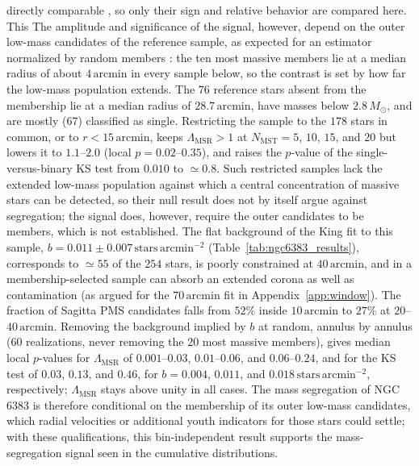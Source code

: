 \documentclass{aa}
\providecommand{\DIFaddtex}[1]{{\protect\color[rgb]{0,0,0.7}#1}} %
\providecommand{\DIFdeltex}[1]{{\protect\color[rgb]{0.65,0,0}\footnotesize #1}} %
\providecommand{\DIFaddbegin}{} %
\providecommand{\DIFaddend}{} %
\providecommand{\DIFdelbegin}{} %
\providecommand{\DIFdelend}{} %
\providecommand{\DIFadd}[1]{\texorpdfstring{\DIFaddtex{#1}}{#1}} %
\providecommand{\DIFdel}[1]{\texorpdfstring{\DIFdeltex{#1}}{}} %
\providecommand{\DIFscaledelfig}{0.5}
\newlength{\DIFdelgraphicswidth} %
\newlength{\DIFdelgraphicsheight} %
\providecommand{\DIFaddincludegraphics}[2][]{{\color{blue}\fbox{\DIFOincludegraphics[#1]{#2}}}} %
\providecommand{\DIFdelincludegraphics}[2][]{%
\sbox{\DIFdelgraphicsbox}{\DIFOincludegraphics[#1]{#2}}%
\settoboxwidth{\DIFdelgraphicswidth}{\DIFdelgraphicsbox} %
\settoboxtotalheight{\DIFdelgraphicsheight}{\DIFdelgraphicsbox} %
\scalebox{\DIFscaledelfig}{%
\parbox[b]{\DIFdelgraphicswidth}{\usebox{\DIFdelgraphicsbox}\\[-\baselineskip] \rule{\DIFdelgraphicswidth}{0em}}\llap{\resizebox{\DIFdelgraphicswidth}{\DIFdelgraphicsheight}{%
\setlength{\unitlength}{\DIFdelgraphicswidth}%
\begin{picture}(1,1)%
\thicklines\linethickness{2pt} %
{\color[rgb]{1,0,0}\put(0,0){\framebox(1,1){}}}%
{\color[rgb]{1,0,0}\put(0,0){\line( 1,1){1}}}%
{\color[rgb]{1,0,0}\put(0,1){\line(1,-1){1}}}%
\end{picture}%
}\hspace*{3pt}}} %
} %
\DeclareRobustCommand{\DIFaddbegin}{\DIFOaddbegin \let\includegraphics\DIFaddincludegraphics} %
\DeclareRobustCommand{\DIFaddend}{\DIFOaddend \let\includegraphics\DIFOincludegraphics} %
\DeclareRobustCommand{\DIFdelbegin}{\DIFOdelbegin \let\includegraphics\DIFdelincludegraphics} %
\DeclareRobustCommand{\DIFdelend}{\DIFOaddend \let\includegraphics\DIFOincludegraphics} %
\begin{document}
directly comparable \citep{2011MNRAS.416..541M}, so only their sign and relative behavior are compared here. \DIFdelbegin \DIFdel{This }\DIFdelend \DIFaddbegin \DIFadd{The amplitude and significance of the signal, however, depend on the outer low-mass candidates of the reference sample, as expected for an estimator normalized by random members \citep{2015MNRAS.449.3381P}: the ten most massive members lie at a median radius of about $4\,\mathrm{arcmin}$ in every sample below, so the contrast is set by how far the low-mass population extends. The $76$ reference stars absent from the \citet{2024arXiv240305143H} membership lie at a median radius of $28.7\,\mathrm{arcmin}$, have masses below $2.8\,M_\odot$, and are mostly ($67$) classified as single. Restricting the sample to the $178$ stars in common, or to $r<15\,\mathrm{arcmin}$, keeps $\Lambda_{\mathrm{MSR}}>1$ at $N_{\mathrm{MST}}=5$, $10$, $15$, and $20$ but lowers it to $1.1$--$2.0$ (local $p=0.02$--$0.35$), and raises the $p$-value of the single-versus-binary KS test from $0.010$ to $\simeq0.8$. Such restricted samples lack the extended low-mass population against which a central concentration of massive stars can be detected, so their null result does not by itself argue against segregation; the signal does, however, require the outer candidates to be members, which is not established. The flat background of the King fit to this sample, $b=0.011\pm0.007\,\mathrm{stars\,arcmin^{-2}}$ (Table~\ref{tab:ngc6383_results}), corresponds to $\simeq55$ of the $254$ stars, is poorly constrained at $40\,\mathrm{arcmin}$, and in a membership-selected sample can absorb an extended corona as well as contamination (as argued for the $70\,\mathrm{arcmin}$ fit in Appendix~\ref{app:window}). The fraction of Sagitta PMS candidates falls from $52\%$ inside $10\,\mathrm{arcmin}$ to $27\%$ at $20$--$40\,\mathrm{arcmin}$. Removing the background implied by $b$ at random, annulus by annulus ($60$ realizations, never removing the $20$ most massive members), gives median local $p$-values for $\Lambda_{\mathrm{MSR}}$ of $0.001$--$0.03$, $0.01$--$0.06$, and $0.06$--$0.24$, and for the KS test of $0.03$, $0.13$, and $0.46$, for $b=0.004$, $0.011$, and $0.018\,\mathrm{stars\,arcmin^{-2}}$, respectively; $\Lambda_{\mathrm{MSR}}$ stays above unity in all cases. The mass segregation of NGC 6383 is therefore conditional on the membership of its outer low-mass candidates, which radial velocities or additional youth indicators for those stars could settle; with these qualifications, this }\DIFaddend bin-independent result supports the \DIFdelbegin \DIFdel{mass-segregation }\DIFdelend signal seen in the cumulative distributions.
\end{document}
